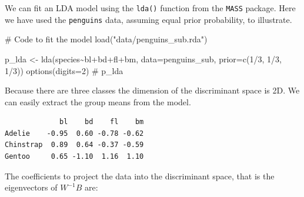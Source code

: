 \documentclass[
  letterpaper,
]{krantz}
\newenvironment{Shaded}{\begin{snugshade}}{\end{snugshade}}
\newcommand{\AttributeTok}[1]{\textcolor[rgb]{0.40,0.45,0.13}{#1}}
\newcommand{\CommentTok}[1]{\textcolor[rgb]{0.37,0.37,0.37}{#1}}
\newcommand{\DecValTok}[1]{\textcolor[rgb]{0.68,0.00,0.00}{#1}}
\newcommand{\FunctionTok}[1]{\textcolor[rgb]{0.28,0.35,0.67}{#1}}
\newcommand{\NormalTok}[1]{\textcolor[rgb]{0.00,0.23,0.31}{#1}}
\newcommand{\OtherTok}[1]{\textcolor[rgb]{0.00,0.23,0.31}{#1}}
\newcommand{\SpecialCharTok}[1]{\textcolor[rgb]{0.37,0.37,0.37}{#1}}
\newcommand{\StringTok}[1]{\textcolor[rgb]{0.13,0.47,0.30}{#1}}
\begin{document}
We can fit an LDA model using the \texttt{lda()} function from the
\texttt{MASS} package. Here we have used the \texttt{penguins} data,
assuming equal prior probability, to illustrate.

 

\begin{Shaded}
\begin{Highlighting}[]
\CommentTok{\# Code to fit the model}
\FunctionTok{load}\NormalTok{(}\StringTok{"data/penguins\_sub.rda"}\NormalTok{)}

\NormalTok{p\_lda }\OtherTok{\textless{}{-}} \FunctionTok{lda}\NormalTok{(species}\SpecialCharTok{\textasciitilde{}}\NormalTok{bl}\SpecialCharTok{+}\NormalTok{bd}\SpecialCharTok{+}\NormalTok{fl}\SpecialCharTok{+}\NormalTok{bm, }
             \AttributeTok{data=}\NormalTok{penguins\_sub,}
             \AttributeTok{prior=}\FunctionTok{c}\NormalTok{(}\DecValTok{1}\SpecialCharTok{/}\DecValTok{3}\NormalTok{, }\DecValTok{1}\SpecialCharTok{/}\DecValTok{3}\NormalTok{, }\DecValTok{1}\SpecialCharTok{/}\DecValTok{3}\NormalTok{))}
\FunctionTok{options}\NormalTok{(}\AttributeTok{digits=}\DecValTok{2}\NormalTok{)}
\CommentTok{\# p\_lda}
\end{Highlighting}
\end{Shaded}

Because there are three classes the dimension of the discriminant space
is 2D. We can easily extract the group means from the model.

\begin{Shaded}
\end{Shaded}

\begin{verbatim}
             bl    bd    fl    bm
Adelie    -0.95  0.60 -0.78 -0.62
Chinstrap  0.89  0.64 -0.37 -0.59
Gentoo     0.65 -1.10  1.16  1.10
\end{verbatim}

The coefficients to project the data into the discriminant space, that
is the eigenvectors of \(W^{-1}B\) are:

\begin{Shaded}
\end{Shaded}
\end{document}
